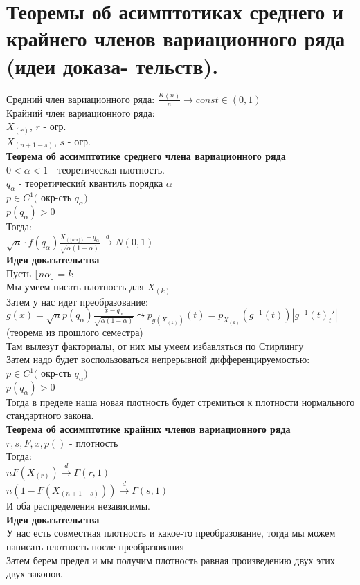 \documentclass{article}
\newcommand\0{\mathbb{0}}
\newcommand\1{\mathbb{1}}
\begin{document}
\section{Теоремы об асимптотиках среднего и крайнего членов вариационного ряда (идеи доказа-
тельств).}
Средний член вариационного ряда: $\frac{K(n)}{n} \to const \in (0,1)$\\
Крайний член вариационного ряда:\\
$X_{(r)}$, $r$ - огр.\\
$X_{(n + 1 - s)}$, $s$ - огр.\\
\textbf{Теорема об ассимптотике среднего члена вариационного ряда}\\
$0 < \alpha < 1$ - теоретическая плотность.\\
$q_\alpha$ - теоретический квантиль порядка $\alpha$\\
$p \in C^1($ окр-сть $q_\alpha)$\\
$p(q_\alpha) > 0$\\
Тогда:\\
$\sqrt{n} \cdot f(q_\alpha) \frac{X_{(\lfloor n \alpha \rfloor)} - q_\alpha}{\sqrt{\alpha (1 - \alpha)}} \xrightarrow[]{d} N(0, 1)$\\
\textbf{Идея доказательства}\\
Пусть $\lfloor n \alpha \rfloor = k$\\
Мы умеем писать плотность для $X_{(k)}$\\
Затем у нас идет преобразование:\\
$g(x) = \sqrt{n}p(q_\alpha)\frac{x - q_\alpha}{\sqrt{\alpha(1 - \alpha)}} \leadsto p_{g(X_{(k)})}(t) = p_{X_{(k)}}(g^{-1}(t))|g^{-1}(t)_t'|$ (теорема из прошлого семестра)\\
Там вылезут факториалы, от них мы умеем избавляться по Стирлингу\\
Затем надо будет воспользоваться непрерывной дифференцируемостью:\\
$p \in C^1($ окр-сть $q_\alpha)$\\
$p(q_\alpha) > 0$\\
Тогда в пределе наша новая плотность будет стремиться к плотности нормального стандартного закона.\\
\textbf{Теорема об ассимптотике крайних членов вариационного ряда}\\
$r,s,F,x,p()$ - плотность\\
Тогда:\\
$n F(X_{(r)}) \xrightarrow[]{d} \Gamma(r,1)$\\
$n (1 - F(X_{(n + 1 - s)})) \xrightarrow[]{d} \Gamma(s, 1)$\\
И оба распределения независимы.\\
\textbf{Идея доказательства}\\
У нас есть совместная плотность и какое-то преобразование, тогда мы можем написать плотность после преобразования\\
Затем берем предел и мы получим плотность равная произведению двух этих двух законов.
\end{document}
